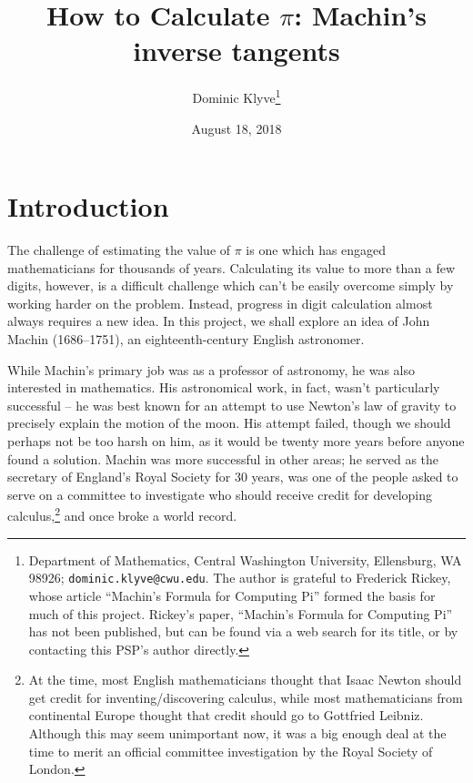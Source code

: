 \documentclass[11pt]{article}
\begin{document}
\title{How to Calculate $\pi$: Machin's inverse tangents}
\author{Dominic Klyve\thanks{Department of Mathematics, Central Washington University, Ellensburg, WA  98926; \texttt{dominic.klyve@cwu.edu}.  The author is grateful to Frederick Rickey, whose article ``Machin's Formula for Computing Pi'' \cite{Rickey} formed the basis for much of this project.  Rickey's paper, ``Machin’s Formula for Computing Pi'' has not been published, but can be found via a web search for its title, or by contacting this PSP's author directly. }}
\date{August 18, 2018}
\bigskip

\maketitle
\thispagestyle{fancy}

\vspace*{-12pt}

\section*{Introduction}

The challenge of estimating the value of $\pi$ is one which has engaged mathematicians for thousands of years. Calculating its value to more than a few digits, however, is a difficult challenge which can't be easily overcome simply by working harder on the problem.  Instead, progress in digit calculation almost always requires a new idea.  In this project, we shall explore an idea of John Machin (1686--1751), an eighteenth-century English astronomer.

While Machin's primary job was as a professor of astronomy, he was also interested in mathematics. His astronomical work, in fact, wasn't particularly successful -- he was best known for an attempt to use Newton's law of gravity to precisely explain the motion of the moon. His attempt failed, though we should perhaps not be too harsh on him, as it would be twenty more years before anyone found a solution. Machin was more successful in other areas; he served as the secretary of England's Royal Society for 30 years, was one of the people asked to serve on a committee to investigate who should receive credit for developing calculus,\footnote{At the time, most English mathematicians thought that Isaac Newton should get credit for inventing/discovering calculus, while most mathematicians from continental Europe thought that credit should go to Gottfried Leibniz. Although this may seem unimportant now, it was a big enough deal at the time to merit an official committee investigation by the Royal Society of London.} and once broke a world record.
\end{document}
